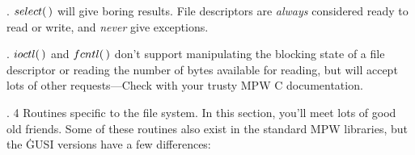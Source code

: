 . \CD{}$\\{select}(\,)$\DC{} will give boring results. File descriptors are
{\it always} considered
ready to read or write, and {\it never} give exceptions.

\fi

. \CD{}$\\{ioctl}(\,)$\DC{} and \CD{}$\\{fcntl}(\,)$\DC{} don't support
manipulating the blocking state of a file
descriptor or reading the number of bytes available for reading, but will
accept
lots of other requests---Check with your trusty MPW C documentation.

\fi

. 4 Routines specific to the file system. In this section, you'll meet lots
of good
old friends. Some of these routines also exist in the standard MPW libraries,
but
the \.{GUSI} versions have a few differences:
\medskip{}

\fi

